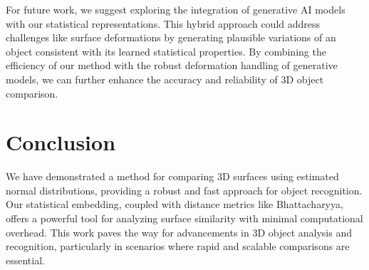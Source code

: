 \documentclass{article}
\begin{document}
For future work, we suggest exploring the integration of generative AI models with our statistical representations. This hybrid approach could address challenges like surface deformations by generating plausible variations of an object consistent with its learned statistical properties. By combining the efficiency of our method with the robust deformation handling of generative models, we can further enhance the accuracy and reliability of 3D object comparison.

\section{Conclusion}
We have demonstrated a method for comparing 3D surfaces using estimated normal distributions, providing a robust and fast approach for object recognition. Our statistical embedding, coupled with distance metrics like Bhattacharyya, offers a powerful tool for analyzing surface similarity with minimal computational overhead. This work paves the way for advancements in 3D object analysis and recognition, particularly in scenarios where rapid and scalable comparisons are essential.


 
\end{document}
